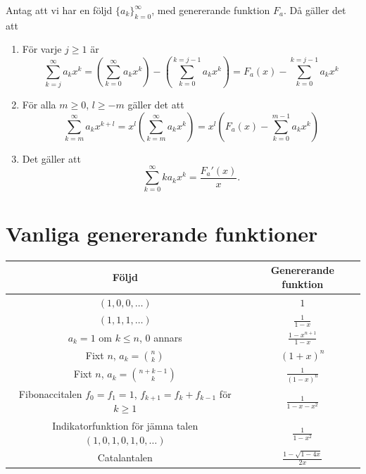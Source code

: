 \documentclass[nobib]{tufte-handout}
\begin{document}
\begin{lemma}
  Antag att vi har en följd $\{a_k\}_{k=0}^\infty$, med genererande funktion $F_a$. Då gäller det att
    \begin{enumerate}
        \item För varje $j \geq 1$ är
        $$\sum_{k = j}^{\infty} a_k x^k = \left(\sum_{k=0}^{\infty}a_k x^k\right) - \left(\sum_{k=0}^{k=j-1} a_kx^k\right) = F_a(x) - \sum_{k=0}^{k=j-1} a_kx^k$$
        \item För alla $m \geq 0$, $l \geq -m$ gäller det att
        $$\sum_{k=m}^{\infty} a_k x^{k + l} = x^l\left(\sum_{k=m}^{\infty} a_k x^{k}\right) = x^l\left(F_a(x) - \sum_{k=0}^{m-1} a_k x^k\right)$$
        \item Det gäller att
        $$\sum_{k=0}^{\infty} k a_k x^k = \frac{F_a'(x)}{x}.$$
    \end{enumerate}
\end{lemma}

\section{Vanliga genererande funktioner}

\begin{tabularx}{\linewidth}{cc}
  Följd & Genererande funktion\\
  \midrule
  $(1, 0, 0, \ldots)$ & $1$\\
  $(1,1,1,\ldots)$ & $\frac{1}{1-x}$\\
  $a_k = 1$ om $k \leq n$, $0$ annars & $\frac{1 - x^{n+1}}{1 - x}$\\
  Fixt $n$, $a_k = \binom{n}{k}$ & $(1+x)^n$\\
  Fixt $n$, $a_k = \binom{n+k-1}{k}$ & $\frac{1}{(1-x)^n}$\\
  \specialcell{Fibonaccitalen\\$f_0 = f_1 = 1$, $f_{k+1} = f_k + f_{k-1}$ för $k \geq 1$} & $\frac{1}{1 - x - x^2}$\\
  \specialcell{Indikatorfunktion för jämna talen\\$(1,0,1,0,1,0,\ldots)$} & $\frac{1}{1-x^2}$\\
  Catalantalen & $\frac{1 - \sqrt{1 - 4x}}{2x}$
\end{tabularx}
\end{document}

